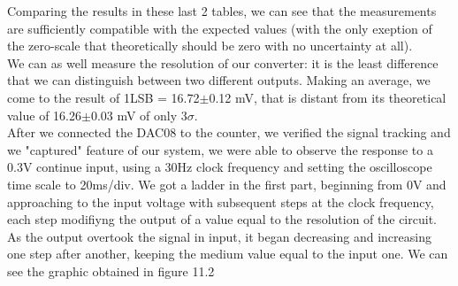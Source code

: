 Comparing the results in these last 2 tables, we can see that the measurements are sufficiently compatible with the expected values (with the only exeption of the zero-scale that theoretically should be zero with no uncertainty at all).\\
We can as well measure the resolution of our converter: it is the least difference that we can distinguish between two different outputs. Making an average, we come to the result of 1LSB = 16.72\(\pm\)0.12 mV, that is distant from its theoretical value of 16.26\(\pm\)0.03 mV of only 3\(\sigma\). \\
After we connected the DAC08 to the counter, we verified the signal tracking and we "captured" feature of our system, we were able to observe the response to a 0.3V continue input, using a 30Hz clock frequency and setting the oscilloscope time scale to 20ms/div. We got a ladder in the first part, beginning from 0V and approaching to the input voltage with subsequent steps at the clock frequency, each step modifiyng the output of a value equal to the resolution of the circuit. As the output overtook the signal in input, it began decreasing and increasing one step after another, keeping the medium value equal to the input one.
We can see the graphic obtained in figure 11.2\\


